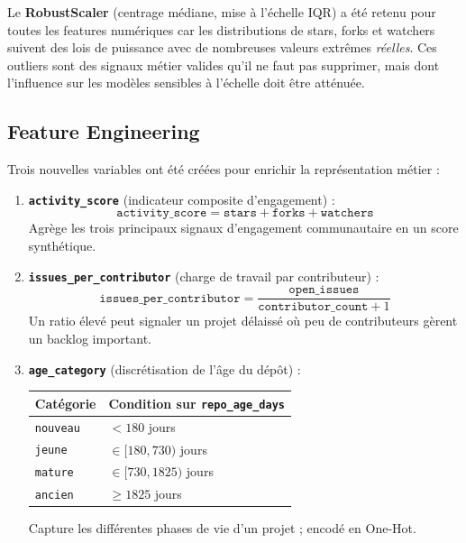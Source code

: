 \documentclass[12pt,a4paper]{article}
\begin{document}
\begin{keybox}
Le \textbf{RobustScaler} (centrage médiane, mise à l'échelle IQR) a été retenu pour toutes les
features numériques car les distributions de stars, forks et watchers suivent des lois de puissance
avec de nombreuses valeurs extrêmes \textit{réelles}. Ces outliers sont des signaux métier valides
qu'il ne faut pas supprimer, mais dont l'influence sur les modèles sensibles à l'échelle doit être
atténuée.
\end{keybox}

\subsection{Feature Engineering}

Trois nouvelles variables ont été créées pour enrichir la représentation métier :

\begin{enumerate}
  \item \textbf{\texttt{activity\_score}} (indicateur composite d'engagement) :
    \[
      \texttt{activity\_score} = \texttt{stars} + \texttt{forks} + \texttt{watchers}
    \]
    Agrège les trois principaux signaux d'engagement communautaire en un score synthétique.

  \item \textbf{\texttt{issues\_per\_contributor}} (charge de travail par contributeur) :
    \[
      \texttt{issues\_per\_contributor} = \frac{\texttt{open\_issues}}{\texttt{contributor\_count} + 1}
    \]
    Un ratio élevé peut signaler un projet délaissé où peu de contributeurs gèrent un backlog important.

  \item \textbf{\texttt{age\_category}} (discrétisation de l'âge du dépôt) :
    \begin{center}
    \begin{tabular}{ll}
      \toprule
      \textbf{Catégorie} & \textbf{Condition sur \texttt{repo\_age\_days}} \\
      \midrule
      \texttt{nouveau} & $< 180$ jours \\
      \texttt{jeune} & $\in [180, 730)$ jours \\
      \texttt{mature} & $\in [730, 1825)$ jours \\
      \texttt{ancien} & $\geq 1825$ jours \\
      \bottomrule
    \end{tabular}
    \end{center}
    Capture les différentes phases de vie d'un projet ; encodé en One-Hot.
\end{enumerate}
\end{document}

